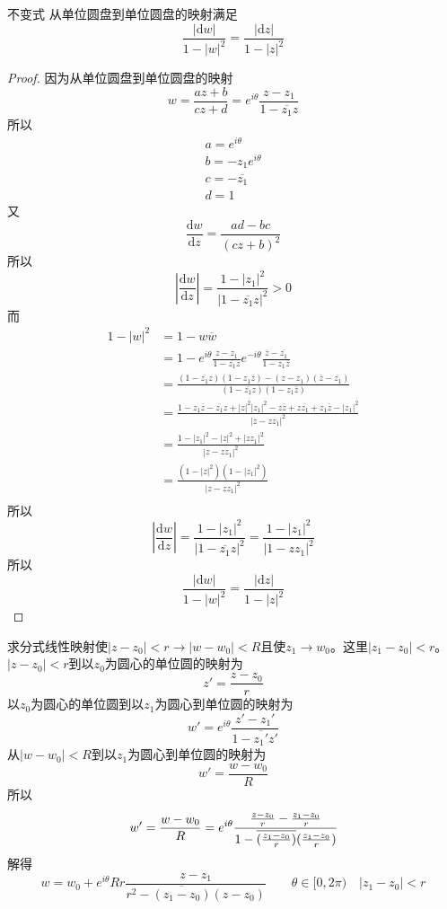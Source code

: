 \begin{corollary*}{不变式}
    从单位圆盘到单位圆盘的映射满足
    \[
    \frac{|\mathrm{d}w|}{1-|w|^2} = \frac{|\mathrm{d}z|}{1-|z|^2}
    \]
\end{corollary*}
\begin{proof}
因为从单位圆盘到单位圆盘的映射
\[
w = \frac{az+b}{cz+d} = e^{i\theta}\frac{z-z_1}{1-\overline{z_1}z}
\]
所以
\begin{gather*}
a = e^{i\theta} \\
b = -z_1e^{i\theta}\\
c = -\overline{z_1} \\
d = 1
\end{gather*}
又
\[
\frac{\mathrm{d}w}{\mathrm{d}z} = \frac{ad-bc}{(cz+b)^2}
\]
所以
\[
\left|\frac{\mathrm{d}w}{\mathrm{d}z}\right| = \frac{1-|z_1|^2}{|1-\overline{z_1}z|^2} > 0
\]
而
\[
\begin{split}
1-|w|^2 &= 1-w\overline{w}\\
&= 1 - e^{i\theta}\frac{z-z_1}{1-\overline{z_1}z}e^{-i\theta}\frac{\overline{z}-\overline{z_1}}{1-z_1\overline{z}} \\
&= \frac{(1-\overline{z_1}z)(1-z_1\overline{z}) - (z-z_1)(\overline{z}-\overline{z_1})}
{(1-\overline{z_1}z)(1-z_1\overline{z})} \\
&= \frac{1-z_1\overline{z}-\overline{z_1}z+|z|^2|z_1|^2-z\overline{z}+z\overline{z_1}+z_1\overline{z}-|z_1|^2}{|z-zz_1|^2} \\
&= \frac{1-|z_1|^2-|z|^2+|zz_1|^2}
{|z-zz_1|^2} \\
&= \frac{(1-|z|^2)(1-|z_1|^2)}
{|z-zz_1|^2}\\
\end{split}
\]
所以
\[
\left|\frac{\mathrm{d}w}{\mathrm{d}z}\right|
= \frac{1-|z_1|^2}{|1-\overline{z_1}z|^2}
 = \frac{1-|z_1|^2}{|1-zz_1|^2}
\]
所以
\[
\frac{|\mathrm{d}w|}{1-|w|^2} = \frac{|\mathrm{d}z|}{1-|z|^2}
\]
\end{proof}

\begin{homeworkProblem}
求分式线性映射使$|z-z_0|<r\longrightarrow|w-w_0|<R$且使$z_1\rightarrow w_0$。这里$|z_1-z_0|<r$。
\newline
\newline
\solution
$|z-z_0|<r$到以$z_0$为圆心的单位圆的映射为
\[
z' = \frac{z-z_0}{r}
\]
以$z_0$为圆心的单位圆到以$z_1$为圆心到单位圆的映射为
\[
w' = e^{i\theta}\frac{z'-z_1'}{1-\overline{z_1'}z'}
\]
从$|w-w_0|<R$到以$z_1$为圆心到单位圆的映射为
\[
w' = \frac{w-w_0}{R}
\]
所以
\[
w' = \frac{w-w_0}{R} = e^{i\theta}\cfrac{\frac{z-z_0}{r} - \frac{z_1-z_0}{r}}
{1 - \overline{(\frac{z_1-z_0}{r})}(\frac{z_1-z_0}{r})}
\]
解得
\[
w = w_0 + e^{i\theta}Rr\frac{z-z_1}{r^2-\overline{(z_1-z_0)}(z-z_0)} \qquad \theta\in[0,2\pi)\quad|z_1-z_0|<r
\]
\end{homeworkProblem}
\newpage
